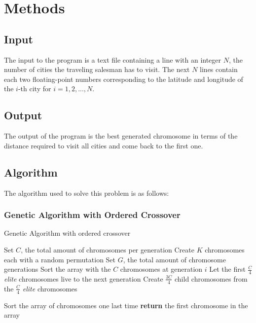 \documentclass[twoside,twocolumn]{article}
\begin{document}
  
  \section{Methods}
  
  \subsection{Input}
  The input to the program is a text file containing a line with an integer $N$, the number of cities the traveling salesman has to visit. The next $N$ lines contain each two floating-point numbers corresponding to the latitude and longitude of the $i$-th city for $i = 1,2,...,N$.
  
  \subsection{Output}
  The output of the program is the best generated chromosome in terms of the distance required to visit all cities and come back to the first one.
  
  \subsection{Algorithm} 
  The algorithm used to solve this problem is as follows:
  
  \subsubsection{Genetic Algorithm with Ordered Crossover}
  
  \begin{algorithm}
          \caption{Genetic Algorithm with ordered crossover}\label{ga}
          {\fontsize{6}{6}\selectfont \begin{algorithmic}[1]
              \State Set $C$, the total amount of chromosomes per generation
              \State Create $K$ chromosomes each with a random permutation
              \State Set $G$, the total amount of chromosome generations 
                \State Sort the array with the $C$ chromosomes at generation $i$
                  \State Let the first $\frac{C}{4}$ \textit{elite} chromosomes live to the next generation
                  \State Create $\frac{3C}{4}$ child chromosomes from the $\frac{C}{4}$ \textit{elite} chromosomes
            
              \EndFor
              \State Sort the array of chromosomes one last time
              \State\textbf{return} the first chromosome in the array
              \EndProcedure
          \end{algorithmic}}
      \end{algorithm}
  
\end{document}
